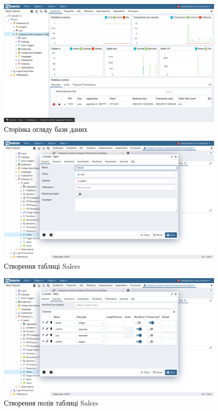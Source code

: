 \documentclass[14pt]{extreport}
\begin{document}
\begin{normalsize}
	\begin{figure}[H]
		\centering
		\includegraphics[scale=0.35]{7}
		\caption{Сторінка огляду бази даних}
	\end{figure}
	
	\begin{figure}[H]
		\centering
		\includegraphics[scale=0.35]{8}
		\caption{Створення таблиці Salers}
	\end{figure}
	
	\begin{figure}[H]
		\centering
		\includegraphics[scale=0.35]{9}
		\caption{Створення полів таблиці Salers}
	\end{figure}
	

\end{normalsize}
\end{document}
